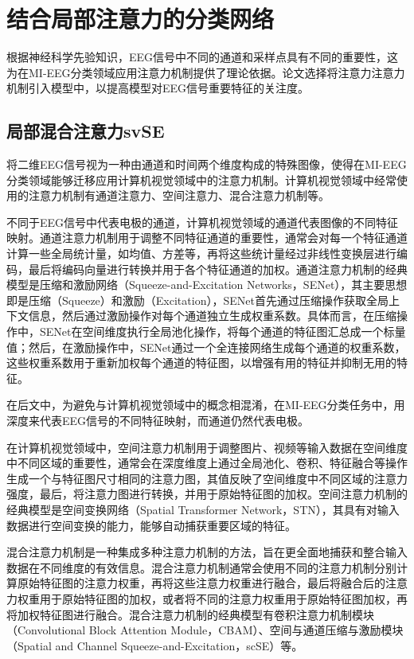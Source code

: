 \section{结合局部注意力的分类网络}

根据神经科学先验知识，EEG信号中不同的通道和采样点具有不同的重要性，这为在MI-EEG分类领域应用注意力机制提供了理论依据。论文选择将注意力注意力机制引入模型中，以提高模型对EEG信号重要特征的关注度。

\subsection{局部混合注意力svSE}

将二维EEG信号视为一种由通道和时间两个维度构成的特殊图像，使得在MI-EEG分类领域能够迁移应用计算机视觉领域中的注意力机制。计算机视觉领域中经常使用的注意力机制有通道注意力、空间注意力、混合注意力机制等。
    
不同于EEG信号中代表电极的通道，计算机视觉领域的通道代表图像的不同特征映射。通道注意力机制用于调整不同特征通道的重要性，通常会对每一个特征通道计算一些全局统计量，如均值、方差等，再将这些统计量经过非线性变换层进行编码，最后将编码向量进行转换并用于各个特征通道的加权。通道注意力机制的经典模型是压缩和激励网络（Squeeze-and-Excitation Networks，SENet）\cite{8578843}，其主要思想即是压缩（Squeeze）和激励（Excitation），SENet首先通过压缩操作获取全局上下文信息，然后通过激励操作对每个通道独立生成权重系数。具体而言，在压缩操作中，SENet在空间维度执行全局池化操作，将每个通道的特征图汇总成一个标量值；然后，在激励操作中，SENet通过一个全连接网络生成每个通道的权重系数，这些权重系数用于重新加权每个通道的特征图，以增强有用的特征并抑制无用的特征。

在后文中，为避免与计算机视觉领域中的概念相混淆，在MI-EEG分类任务中，用深度来代表EEG信号的不同特征映射，而通道仍然代表电极。
    
在计算机视觉领域中，空间注意力机制用于调整图片、视频等输入数据在空间维度中不同区域的重要性，通常会在深度维度上通过全局池化、卷积、特征融合等操作生成一个与特征图尺寸相同的注意力图，其值反映了空间维度中不同区域的注意力强度，最后，将注意力图进行转换，并用于原始特征图的加权。空间注意力机制的经典模型是空间变换网络（Spatial Transformer Network，STN）\cite{jaderberg2015spatial}，其具有对输入数据进行空间变换的能力，能够自动捕获重要区域的特征。
    
混合注意力机制是一种集成多种注意力机制的方法，旨在更全面地捕获和整合输入数据在不同维度的有效信息。混合注意力机制通常会使用不同的注意力机制分别计算原始特征图的注意力权重，再将这些注意力权重进行融合，最后将融合后的注意力权重用于原始特征图的加权，或者将不同的注意力权重用于原始特征图加权，再将加权特征图进行融合。混合注意力机制的经典模型有卷积注意力机制模块（Convolutional Block Attention Module，CBAM）\cite{woo2018cbam}、空间与通道压缩与激励模块（Spatial and Channel Squeeze-and-Excitation，scSE）\cite{roy2018concurrent}等。
    
